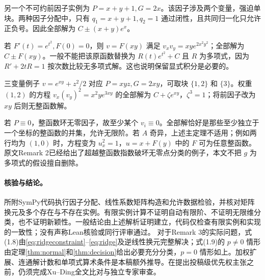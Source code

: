 \documentclass[UTF8,a4paper,zihao=-4,fontset=none]{ctexart}
\numberwithin{equation}{section}
\theoremstyle{definition}
\theoremstyle{definition}\newtheorem{definition}[theorem]{定义}
\begin{document}
另一个不可约前因子实例为 $P=x+y+1,G=2x$。该因子涉及两个变量，强迫单块。两种因子分配中，只有 $q_1=x+y+1,q_2=1$ 通过闭性，且共同归一化只允许正负号。因此全部解为 $C\pm(x+y)e^x$。

若 $F'(t)=e^{t^2},F(0)=0$，则 $v=F(xy)$ 满足 $v_xv_y=xy e^{2x^2y^2}$；全部解为 $C\pm F(xy)$。一般不能把该原函数替换为 $R(t)e^{t^2}+C$ 且 $R$ 为多项式，因为 $R'+2tR=1$ 按次数比较无多项式解。这也说明保留显式积分是必要的。

三变量例子 $v=e^{xy}+z^2/2$ 对应 $P=xyz,G=2xy$，可取块 $\{1,2\}$ 和 $\{3\}$。权重 $(1,2)$ 的方程 $v_x(v_y)^2=x^2y e^{3xy}$ 的全部解为 $C+\zeta e^{xy}$，$\zeta^3=1$；将前因子改为 $xy$ 后则无整函数解。

若 $P\equiv0$，整函数环无零因子，故至少某个 $v_i\equiv0$。全部解恰好是那些至少独立于一个坐标的整函数的并集，允许无限阶。若 $A$ 奇异，上述主定理不适用；例如两行均为 $(1,0)$ 时，方程变为 $u_x^2=1$，$u=x+F(y)$ 中的 $F$ 可为任意整函数。原文Remark 2已经给出了超越整函数指数破坏无零点分类的例子，本文不把 $g$ 为多项式的假设擅自删除。

\paragraph{核验与结论。}
所附SymPy代码执行因子分配、线性系数矩阵构造和允许数据检验，并核对矩阵换元及多个存在与不存在实例。有限实例计算不证明自动有限阶、不证明无限维分类，也不证明新颖性。一般结论由上述解析证明建立，代码仅检查有限实例和实现的一致性；没有声称Lean核验或同行评审通过。
对于Remark 3的实际问题，式(1.8)由\eqref{eq:ridgeconstraint}--\eqref{eq:ridge}及逆线性换元完整解决；式(1.9)的 $p\ne0$ 情形由定理\ref{thm:normal}和\ref{thm:decision}给出必要充分分类，$p=0$ 情形如上。加权扩展、连通解计数和单项式算术条件是本稿额外推导。在提出投稿级优先权主张之前，仍须完成Xu--Ding全文比对与独立专家审查。


\end{document}
